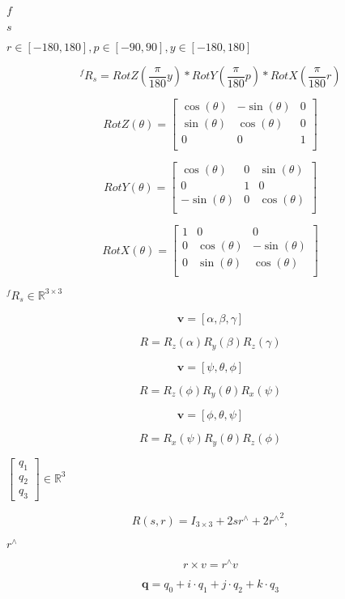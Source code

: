 \documentclass{article}
\begin{document}
$ f $
\pagebreak

$ s $
\pagebreak

$ r \in [-180, 180] , p \in [-90, 90], y \in [-180, 180]$
\pagebreak

\[ {}^f R_s = RotZ\left(\frac{\pi}{180}y\right)*RotY\left(\frac{\pi}{180}p\right)*RotX\left(\frac{\pi}{180}r\right) \]
\pagebreak

\[ RotZ(\theta) = \begin{bmatrix} \cos(\theta) & -\sin(\theta) & 0 \\ \sin(\theta) & \cos(\theta) & 0 \\ 0 & 0 & 1 \\ \end{bmatrix} \]
\pagebreak

\[ RotY(\theta) = \begin{bmatrix} \cos(\theta) & 0 & \sin(\theta) \\ 0 & 1 & 0 \\ -\sin(\theta) & 0 & \cos(\theta) \\ \end{bmatrix} \]
\pagebreak

\[ RotX(\theta) = \begin{bmatrix} 1 & 0 & 0 \\ 0 & \cos(\theta) & - \sin(\theta) \\ 0 & \sin(\theta) & \cos(\theta) \\ \end{bmatrix} \]
\pagebreak

$ {}^f R_s \in \mathbb{R}^{3 \times 3} $
\pagebreak

\[ \mathbf{v} = [\alpha, \beta, \gamma ]\]
\pagebreak

\[ R = R_z(\alpha) R_y(\beta) R_z(\gamma) \]
\pagebreak

\[ \mathbf{v} = [\psi, \theta, \phi ]\]
\pagebreak

\[ R = R_z(\phi) R_y(\theta) R_x(\psi) \]
\pagebreak

\[ \mathbf{v} = [\phi, \theta, \psi ]\]
\pagebreak

\[ R = R_x(\psi) R_y(\theta) R_z(\phi) \]
\pagebreak

$ \begin{bmatrix} q_1 \\ q_2 \\ q_3 \end{bmatrix} \in \mathbb{R}^3 $
\pagebreak

\[ R(s,r) = I_{3\times3} + 2s r^{\wedge} + 2{r^\wedge}^2, \]
\pagebreak

$ r^{\wedge} $
\pagebreak

\[ r \times v = r^\wedge v \]
\pagebreak

\[ \mathbf{q}=q_0 + i \cdot q_1 + j \cdot q_2 + k \cdot q_3 \]
\pagebreak
\end{document}
